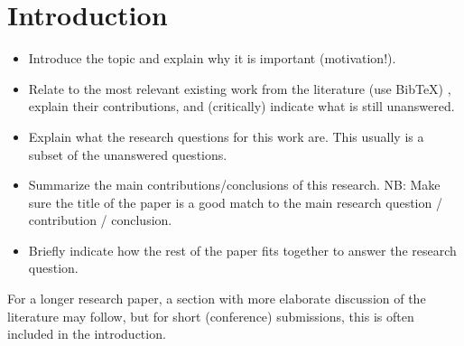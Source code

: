 \section{Introduction}
\begin{itemize}
\item Introduce the topic and explain why it is important (motivation!).

\item Relate to the most relevant existing work from the literature (use BibTeX) \cite{example}, explain their contributions, and (critically) indicate what is still unanswered. 


\item Explain what the research questions for this work are. 
This usually is a subset of the unanswered questions. 

\item Summarize the main contributions/conclusions of this research.
NB: Make sure the title of the paper is a good match to the main research question / contribution / conclusion.

\item Briefly indicate how the rest of the paper fits together to answer the research question.
\end{itemize}

For a longer research paper, a section with more elaborate discussion of the literature may follow, but for short (conference) submissions, this is often included in the introduction.